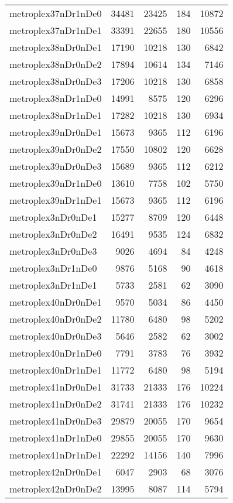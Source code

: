 \begin{longtable}{lrrrr}
metroplex37nDr1nDe0 & 34481 & 23425 & 184 & 10872 \\
metroplex37nDr1nDe1 & 33391 & 22655 & 180 & 10556 \\
metroplex38nDr0nDe1 & 17190 & 10218 & 130 & 6842 \\
metroplex38nDr0nDe2 & 17894 & 10614 & 134 & 7146 \\
metroplex38nDr0nDe3 & 17206 & 10218 & 130 & 6858 \\
metroplex38nDr1nDe0 & 14991 & 8575 & 120 & 6296 \\
metroplex38nDr1nDe1 & 17282 & 10218 & 130 & 6934 \\
metroplex39nDr0nDe1 & 15673 & 9365 & 112 & 6196 \\
metroplex39nDr0nDe2 & 17550 & 10802 & 120 & 6628 \\
metroplex39nDr0nDe3 & 15689 & 9365 & 112 & 6212 \\
metroplex39nDr1nDe0 & 13610 & 7758 & 102 & 5750 \\
metroplex39nDr1nDe1 & 15673 & 9365 & 112 & 6196 \\
metroplex3nDr0nDe1 & 15277 & 8709 & 120 & 6448 \\
metroplex3nDr0nDe2 & 16491 & 9535 & 124 & 6832 \\
metroplex3nDr0nDe3 & 9026 & 4694 & 84 & 4248 \\
metroplex3nDr1nDe0 & 9876 & 5168 & 90 & 4618 \\
metroplex3nDr1nDe1 & 5733 & 2581 & 62 & 3090 \\
metroplex40nDr0nDe1 & 9570 & 5034 & 86 & 4450 \\
metroplex40nDr0nDe2 & 11780 & 6480 & 98 & 5202 \\
metroplex40nDr0nDe3 & 5646 & 2582 & 62 & 3002 \\
metroplex40nDr1nDe0 & 7791 & 3783 & 76 & 3932 \\
metroplex40nDr1nDe1 & 11772 & 6480 & 98 & 5194 \\
metroplex41nDr0nDe1 & 31733 & 21333 & 176 & 10224 \\
metroplex41nDr0nDe2 & 31741 & 21333 & 176 & 10232 \\
metroplex41nDr0nDe3 & 29879 & 20055 & 170 & 9654 \\
metroplex41nDr1nDe0 & 29855 & 20055 & 170 & 9630 \\
metroplex41nDr1nDe1 & 22292 & 14156 & 140 & 7996 \\
metroplex42nDr0nDe1 & 6047 & 2903 & 68 & 3076 \\
metroplex42nDr0nDe2 & 13995 & 8087 & 114 & 5794 \\

\end{longtable}
